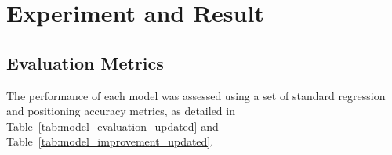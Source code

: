 \documentclass{isprs} %
\begin{document}
\section{Experiment and Result}\label{sec:Experiment and Result}

\subsection{Evaluation Metrics}\label{sec:Evaluation Metrics}
The performance of each model was assessed using a set of standard regression and positioning accuracy metrics, as detailed in Table~\ref{tab:model_evaluation_updated} and Table~\ref{tab:model_improvement_updated}.

\end{document}
